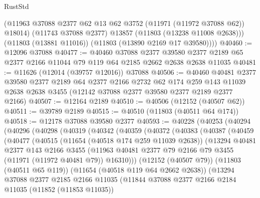 \begin{lexlean}{RustStd}
\begin{coremodule}
          (@11963 @37088 @2377 @62 @13 @62 @3752 (@11971 (@11972 @37088 @62)) @18014)
          (@11743 @37088 @2377)
          @13857
          (@11803 (@13238 @11008 @2638)))
        (@11803 (@13881 @11016))
        (@11803 (@13890 @2169 @17 @39580))))
@40460 := @12096 @37088
@40477 := @40460
    @37088
    @2377
    @39580
    @2377
    @2189
    @65
    @2377
    @2166
    @11044
    @79
    @119
    @64
    @2185
    @2662
    @2638
    @2638
    @11035
@40481 := @11626 (@12014 (@39757 @12016)) @37088
@40506 := @40460
    @40481
    @2377
    @39580
    @2377
    @2189
    @64
    @2377
    @2166
    @2732
    @62
    @174
    @259
    @143
    @11039
    @2638
    @2638
    @3455
    (@12142 @37088 @2377 @39580 @2377 @2189 @2377 @2166)
@40507 := @12164 @2189
@40510 := @40506 (@12152 (@40507 @62))
@40511 := @39789 @2189
@40515 := @40510 (@11803 (@40511 @64 @174))
@40518 := @12178 @37088 @39580 @2377
@40593 := @40228
    (@40253
      (@40294
        (@40296
          (@40298
            (@40319
              (@40342
                (@40359
                  (@40372
                    (@40383
                      (@40387
                        (@40459
                          (@40477
                            (@40515
                              (@11654 (@40518 @174 @259 @11039 @2638))
                              (@13294
                                @40481
                                @2377
                                @143
                                @2166
                                @3455
                                (@11963
                                  @40481
                                  @2377
                                  @79
                                  @2166
                                  @79
                                  @3455
                                  (@11971 (@11972 @40481 @79))
                                  @16310)))
                            (@12152 (@40507 @79))
                            (@11803 (@40511 @65 @119))
                            (@11654 (@40518 @119 @64 @2662 @2638))
                            (@13294
                              @37088
                              @2377
                              @2185
                              @2166
                              @11035
                              (@11844
                                @37088
                                @2377
                                @2166
                                @2184
                                @11035
                                (@11852 (@11853 @11035))

\end{coremodule}
\end{lexlean}
